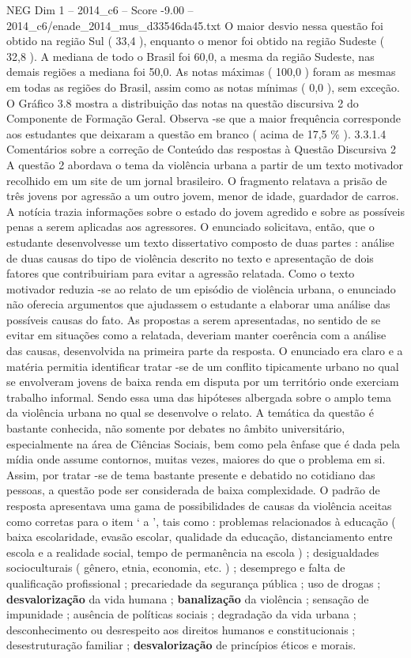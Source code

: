 \begin{textsample}{NEG Dim 1 – 2014\_c6 – Score -9.00 – 2014\_c6/enade\_2014\_mus\_d33546da45.txt}
O maior desvio nessa questão foi obtido na região Sul ( 33,4 ), enquanto o menor foi obtido na região Sudeste ( 32,8 ).
A mediana de todo o Brasil foi 60,0, a mesma da região Sudeste, nas demais regiões a mediana foi 50,0.
As notas máximas ( 100,0 ) foram as mesmas em todas as regiões do Brasil, assim como as notas mínimas ( 0,0 ), sem exceção.
O Gráfico 3.8 mostra a distribuição das notas na questão discursiva 2 do Componente de Formação Geral.
Observa -se que a maior frequência corresponde aos estudantes que deixaram a questão em branco ( acima de 17,5 \% ). 3.3.1.4 Comentários sobre a correção de Conteúdo das respostas à Questão Discursiva 2 A questão 2 abordava o tema da violência urbana a partir de um texto motivador recolhido em um site de um jornal brasileiro.
O fragmento relatava a prisão de três jovens por agressão a um outro jovem, menor de idade, guardador de carros.
A notícia trazia informações sobre o estado do jovem agredido e sobre as possíveis penas a serem aplicadas aos agressores.
O enunciado solicitava, então, que o estudante desenvolvesse um texto dissertativo composto de duas partes : análise de duas causas do tipo de violência descrito no texto e apresentação de dois fatores que contribuiriam para evitar a agressão relatada.
Como o texto motivador reduzia -se ao relato de um episódio de violência urbana, o enunciado não oferecia argumentos que ajudassem o estudante a elaborar uma análise das possíveis causas do fato.
As propostas a serem apresentadas, no sentido de se evitar em situações como a relatada, deveriam manter coerência com a análise das causas, desenvolvida na primeira parte da resposta.
O enunciado era claro e a matéria permitia identificar tratar -se de um conflito tipicamente urbano no qual se envolveram jovens de baixa renda em disputa por um território onde exerciam trabalho informal.
Sendo essa uma das hipóteses albergada sobre o amplo tema da violência urbana no qual se desenvolve o relato.
A temática da questão é bastante conhecida, não somente por debates no âmbito universitário, especialmente na área de Ciências Sociais, bem como pela ênfase que é dada pela mídia onde assume contornos, muitas vezes, maiores do que o problema em si.
Assim, por tratar -se de tema bastante presente e debatido no cotidiano das pessoas, a questão pode ser considerada de baixa complexidade.
O padrão de resposta apresentava uma gama de possibilidades de causas da violência aceitas como corretas para o item ‘ a ’, tais como : problemas relacionados à educação ( baixa escolaridade, evasão escolar, qualidade da educação, distanciamento entre escola e a realidade social, tempo de permanência na escola ) ; desigualdades socioculturais ( gênero, etnia, economia, etc. ) ; desemprego e falta de qualificação profissional ; precariedade da segurança pública ; uso de drogas ; \textbf{desvalorização} da vida humana ; \textbf{banalização} da violência ; sensação de impunidade ; ausência de políticas sociais ; degradação da vida urbana ; desconhecimento ou desrespeito aos direitos humanos e constitucionais ; desestruturação familiar ; \textbf{desvalorização} de princípios éticos e morais.

\end{textsample}
